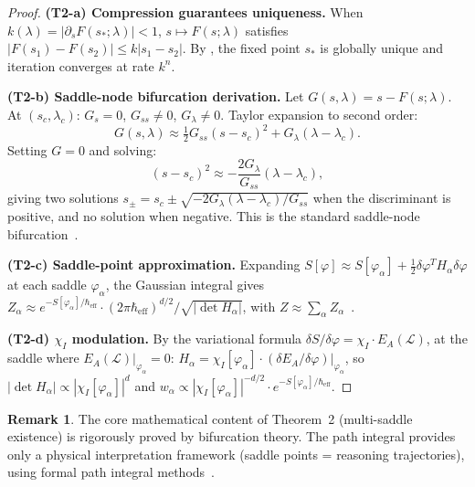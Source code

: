 \documentclass[12pt,a4paper]{article}
\theoremstyle{definition}
\newtheorem{remark}[theorem]{Remark}
\newcommand{\mL}{\mathcal{L}}
\newcommand{\chiI}{\chi_I}
\newcommand{\EA}{E_A}
\newcommand{\Heff}{\hbar_{\mathrm{eff}}}
\begin{document}
\begin{proof}
\textbf{(T2-a) Compression guarantees uniqueness.}
When $k(\lambda) = |\partial_s F(s_*; \lambda)| < 1$, $s \mapsto F(s; \lambda)$ satisfies $|F(s_1) - F(s_2)| \leq k |s_1 - s_2|$. By , the fixed point $s_*$ is globally unique and iteration converges at rate $k^n$.

\textbf{(T2-b) Saddle-node bifurcation derivation.}
Let $G(s, \lambda) = s - F(s; \lambda)$. At $(s_c, \lambda_c)$: $G_s = 0$, $G_{ss} \neq 0$, $G_\lambda \neq 0$. Taylor expansion to second order:
\begin{equation}
G(s, \lambda) \approx \tfrac{1}{2} G_{ss}(s - s_c)^2 + G_\lambda(\lambda - \lambda_c).
\end{equation}
Setting $G = 0$ and solving:
\begin{equation}
(s - s_c)^2 \approx -\frac{2 G_\lambda}{G_{ss}}(\lambda - \lambda_c),
\end{equation}
giving two solutions $s_\pm = s_c \pm \sqrt{-2G_\lambda(\lambda - \lambda_c)/G_{ss}}$ when the discriminant is positive, and no solution when negative. This is the standard saddle-node bifurcation~\cite{Strogatz2014, Kuznetsov2004}.

\textbf{(T2-c) Saddle-point approximation.}
Expanding $S[\varphi] \approx S[\varphi_\alpha] + \tfrac{1}{2}\delta\varphi^T H_\alpha \delta\varphi$ at each saddle $\varphi_\alpha$, the Gaussian integral gives $Z_\alpha \approx e^{-S[\varphi_\alpha]/\Heff} \cdot (2\pi\Heff)^{d/2}/\sqrt{|\det H_\alpha|}$, with $Z \approx \sum_\alpha Z_\alpha$~\cite{Kleinert2009, ZinnJustin2002}.

\textbf{(T2-d) $\chiI$ modulation.}
By the variational formula $\delta S/\delta\varphi = \chiI \cdot \EA(\mL)$, at the saddle where $\EA(\mL)|_{\varphi_\alpha} = 0$: $H_\alpha = \chiI[\varphi_\alpha] \cdot (\delta\EA/\delta\varphi)|_{\varphi_\alpha}$, so $|\det H_\alpha| \propto |\chiI[\varphi_\alpha]|^d$ and $w_\alpha \propto |\chiI[\varphi_\alpha]|^{-d/2} \cdot e^{-S[\varphi_\alpha]/\Heff}$.
\end{proof}

\begin{remark}
The core mathematical content of Theorem~2 (multi-saddle existence) is rigorously proved by bifurcation theory. The path integral provides only a physical interpretation framework (saddle points = reasoning trajectories), using formal path integral methods~\cite{Kleinert2009, ZinnJustin2002}.
\end{remark}
\end{document}
